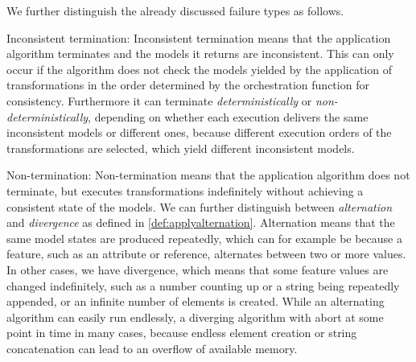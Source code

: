 
We further distinguish the already discussed failure types as follows.
\begin{properdescription}
    \item[Inconsistent termination:] 
    Inconsistent termination means that the application algorithm terminates and the models it returns are inconsistent.
    This can only occur if the algorithm does not check the models yielded by the application of transformations in the order determined by the orchestration function for consistency.
    Furthermore it can terminate \emph{deterministically} or \emph{non-deterministically}, depending on whether each execution delivers the same inconsistent models or different ones, because different execution orders of the transformations are selected, which yield different inconsistent models.

    \item[Non-termination:] 
    Non-termination means that the application algorithm does not terminate, but executes transformations indefinitely without achieving a consistent state of the models.
    We can further distinguish between \emph{alternation} and \emph{divergence} as defined in \autoref{def:applyalternation}.
    Alternation means that the same model states are produced repeatedly, which can for example be because a feature, such as an attribute or reference, alternates between two or more values.
    In other cases, we have divergence, which means that some feature values are changed indefinitely, such as a number counting up or a string being repeatedly appended, or an infinite number of elements is created.
    While an alternating algorithm can easily run endlessly, a diverging algorithm with abort at some point in time in many cases, because endless element creation or string concatenation can lead to an overflow of available memory.
    

\end{properdescription}
